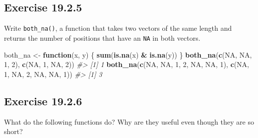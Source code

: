 \documentclass[]{book}
\newenvironment{Shaded}{\begin{snugshade}}{\end{snugshade}}
\newcommand{\CommentTok}[1]{\textcolor[rgb]{0.56,0.35,0.01}{\textit{#1}}}
\newcommand{\ControlFlowTok}[1]{\textcolor[rgb]{0.13,0.29,0.53}{\textbf{#1}}}
\newcommand{\DecValTok}[1]{\textcolor[rgb]{0.00,0.00,0.81}{#1}}
\newcommand{\KeywordTok}[1]{\textcolor[rgb]{0.13,0.29,0.53}{\textbf{#1}}}
\newcommand{\NormalTok}[1]{#1}
\newcommand{\OperatorTok}[1]{\textcolor[rgb]{0.81,0.36,0.00}{\textbf{#1}}}
\newcommand{\OtherTok}[1]{\textcolor[rgb]{0.56,0.35,0.01}{#1}}
\newcommand{\StringTok}[1]{\textcolor[rgb]{0.31,0.60,0.02}{#1}}
\theoremstyle{plain}
\theoremstyle{remark}
\begin{document}
\hypertarget{exercise-19.2.5}{%
\subsection*{\texorpdfstring{Exercise
{19.2.5}}{Exercise 19.2.5}}\label{exercise-19.2.5}}

Write \texttt{both\_na()}, a function that takes two vectors of the same
length and returns the number of positions that have an \texttt{NA} in
both vectors.

\begin{Shaded}
\begin{Highlighting}[]
\NormalTok{both_na <-}\StringTok{ }\ControlFlowTok{function}\NormalTok{(x, y) \{}
  \KeywordTok{sum}\NormalTok{(}\KeywordTok{is.na}\NormalTok{(x) }\OperatorTok{&}\StringTok{ }\KeywordTok{is.na}\NormalTok{(y))}
\NormalTok{\}}
\KeywordTok{both_na}\NormalTok{(}\KeywordTok{c}\NormalTok{(}\OtherTok{NA}\NormalTok{, }\OtherTok{NA}\NormalTok{,  }\DecValTok{1}\NormalTok{, }\DecValTok{2}\NormalTok{),}
        \KeywordTok{c}\NormalTok{(}\OtherTok{NA}\NormalTok{,  }\DecValTok{1}\NormalTok{, }\OtherTok{NA}\NormalTok{, }\DecValTok{2}\NormalTok{))}
\CommentTok{#> [1] 1}
\KeywordTok{both_na}\NormalTok{(}\KeywordTok{c}\NormalTok{(}\OtherTok{NA}\NormalTok{, }\OtherTok{NA}\NormalTok{,  }\DecValTok{1}\NormalTok{, }\DecValTok{2}\NormalTok{, }\OtherTok{NA}\NormalTok{, }\OtherTok{NA}\NormalTok{, }\DecValTok{1}\NormalTok{),}
        \KeywordTok{c}\NormalTok{(}\OtherTok{NA}\NormalTok{,  }\DecValTok{1}\NormalTok{, }\OtherTok{NA}\NormalTok{, }\DecValTok{2}\NormalTok{, }\OtherTok{NA}\NormalTok{, }\OtherTok{NA}\NormalTok{, }\DecValTok{1}\NormalTok{))}
\CommentTok{#> [1] 3}
\end{Highlighting}
\end{Shaded}

\hypertarget{exercise-19.2.6}{%
\subsection*{\texorpdfstring{Exercise
{19.2.6}}{Exercise 19.2.6}}\label{exercise-19.2.6}}

What do the following functions do? Why are they useful even though they
are so short?

\begin{Shaded}
\end{Shaded}
\end{document}
